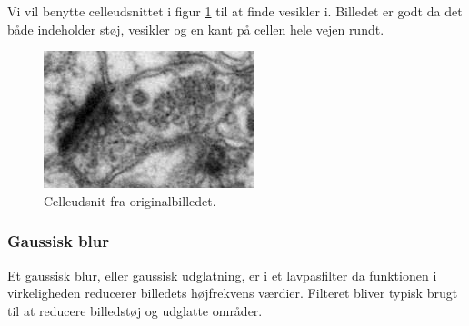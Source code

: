 Vi vil benytte celleudsnittet i figur \ref{fig:premethod_celle} til at finde vesikler i. Billedet er godt da det både indeholder støj, vesikler og en kant på cellen hele vejen rundt.

\begin{figure}[H]
	\centering
	\includegraphics[scale=2.5]{files/premethod/img/celle1.png}
	\caption{Celleudsnit fra originalbilledet.\label{fig:premethod_celle}}
\end{figure}

\subsubsection{Gaussisk blur}
Et gaussisk blur, eller gaussisk udglatning, er i et lavpasfilter da funktionen i virkeligheden reducerer billedets højfrekvens værdier. Filteret bliver typisk brugt til at reducere billedstøj og udglatte områder. 

